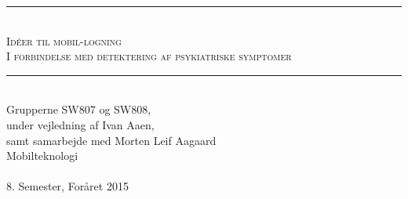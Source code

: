 
\setcounter{secnumdepth}{1}


\begin{titlepage}

\begin{center}
\newcommand{\HRule}{\rule{\linewidth}{0.5mm}}
\HRule \\[0.4cm]
\textsc{ \Huge Idéer til mobil-logning \\[0.2cm]
\large I forbindelse med detektering af psykiatriske symptomer}\\[0.4cm]

\HRule \\[1cm]

{\Large Grupperne SW807 og SW808,\\
under vejledning af Ivan Aaen,\\
samt samarbejde med Morten Leif Aagaard} \\[2cm]

\vfill
{\Large Mobilteknologi}
\\ ~\\
{\large 8. Semester, Foråret 2015}

\end{center}
\end{titlepage}


\newpage

\newpage

\newpage

\newpage

\newpage

\newpage

\newpage

\newpage

\newpage

\newpage

\newpage

\newpage


\newpage


